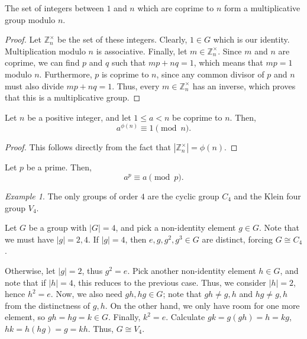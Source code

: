 \documentclass[11pt]{article}
\newcommand{\Z}{\mathbb{Z}}
\theoremstyle{definition}
\theoremstyle{remark}
\newtheorem*{example}{Example}
\numberwithin{equation}{section}
\begin{document}
    \begin{theorem}
        The set of integers between $1$ and $n$ which are coprime to $n$ form a
        multiplicative group modulo $n$.
    \end{theorem}
    \begin{proof}
        Let $\Z_n^\times$ be the set of these integers. Clearly, $1 \in G$ which is
        our identity. Multiplication modulo $n$ is associative. Finally, let $m \in
        \Z_n^\times$.  Since $m$ and $n$ are coprime, we can find $p$ and $q$ such
        that $mp + nq = 1$, which means that $mp = 1$ modulo $n$. Furthermore, $p$ is
        coprime to $n$, since any common divisor of $p$ and $n$ must also divide $mp
        + nq = 1$. Thus, every $m \in \Z_n^\times$ has an inverse, which proves that
        this is a multiplicative group.
    \end{proof}

    \begin{corollary}
        Let $n$ be a positive integer, and let $1 \leq a < n$ be coprime to $n$.
        Then, \[
            a^{\phi(n)} \equiv 1 \pmod{n}.
        \] 
    \end{corollary}
    \begin{proof}
        This follows directly from the fact that $|\Z_n^\times| = \phi(n)$.
    \end{proof}
    \begin{corollary}
        Let $p$ be a prime. Then, \[
            a^p \equiv a \pmod{p}.
        \] 
    \end{corollary}

    \begin{example}
        The only groups of order $4$ are the cyclic group $C_4$ and the Klein four
        group $V_4$.

        Let $G$ be a group with $|G| = 4$, and pick a non-identity element $g \in G$.
        Note that we must have $|g| = 2, 4$. If $|g| = 4$, then $e, g, g^2, g^3 \in
        G$ are distinct, forcing $G \cong C_4$.

        Otherwise, let $|g| = 2$, thus $g^2 = e$. Pick another non-identity element
        $h \in G$, and note that if $|h| = 4$, this reduces to the previous case.
        Thus, we consider $|h| = 2$, hence $h^2 = e$. Now, we also need $gh, hg \in
        G$; note that $gh \neq g, h$ and $hg \neq g, h$ from the distinctness of $g,
        h$. On the other hand, we only have room for one more element, so $gh = hg =
        k \in G$. Finally, $k^2 = e$. Calculate $gk = g(gh) = h = kg$, $hk = h(hg) =
        g = kh$. Thus, $G \cong V_4$.
    \end{example}
\end{document}
